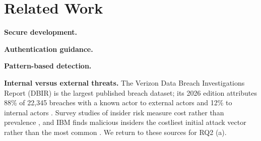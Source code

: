 \section{Related Work}

\textbf{Secure development.} 

\textbf{Authentication guidance.} 

\textbf{Pattern-based detection.} 

\textbf{Internal versus external threats.} The Verizon Data Breach Investigations Report (DBIR) is the largest published breach dataset; its 2026 edition attributes 88\% of 22,345 breaches with a known actor to external actors and 12\% to internal actors \cite{dbir2026}. Survey studies of insider risk measure cost rather than prevalence \cite{dtex2026}, and IBM finds malicious insiders the costliest initial attack vector rather than the most common \cite{ibm2025}. We return to these sources for RQ2 (a).
